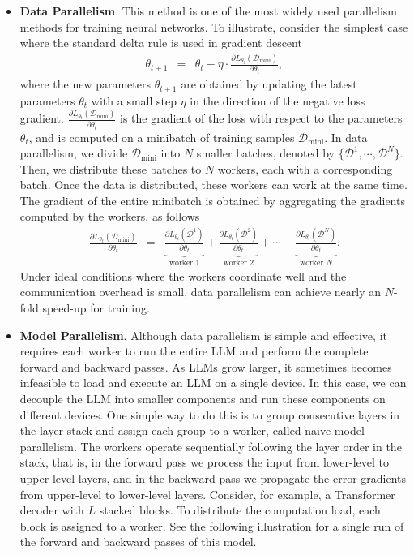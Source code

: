 \begin{itemize}
\item \vspace{0.5em} \textbf{Data Parallelism}. This method is one of the most widely used parallelism methods for training neural networks. To illustrate, consider the simplest case where the standard delta rule is used in gradient descent
    \begin{eqnarray}
    \theta_{t+1} & = & \theta_{t} - \eta \cdot \frac{\partial L_{\theta_t}(\mathcal{D}_{\mathrm{mini}})}{\partial \theta_t},
    \end{eqnarray}
    \noindent where the new parameters $\theta_{t+1}$ are obtained by updating the latest parameters $\theta_{t}$ with a small step $\eta$ in the direction of the negative loss gradient. $\frac{\partial L_{\theta_t}(\mathcal{D}_{\mathrm{mini}})}{\partial \theta_t}$ is the gradient of the loss with respect to the parameters $\theta_t$, and is computed on a minibatch of training samples $\mathcal{D}_{\mathrm{mini}}$. In data parallelism, we divide $\mathcal{D}_{\mathrm{mini}}$ into $N$ smaller batches, denoted by $\{\mathcal{D}^{1},\cdots,\mathcal{D}^{N}\}$. Then, we distribute these batches to $N$ workers, each with a corresponding batch. Once the data is distributed, these workers can work at the same time. The gradient of the entire minibatch is obtained by aggregating the gradients computed by the workers, as follows
    \begin{eqnarray}
    \frac{\partial L_{\theta_t}(\mathcal{D}_{\mathrm{mini}})}{\partial \theta_t} & = & \underbrace{\frac{\partial L_{\theta_t}(\mathcal{D}^{1})}{\partial \theta_t}}_{\textrm{worker 1}} + \underbrace{\frac{\partial L_{\theta_t}(\mathcal{D}^{2})}{\partial \theta_t}}_{\textrm{worker 2}} + \cdots + \underbrace{\frac{\partial L_{\theta_t}(\mathcal{D}^{N})}{\partial \theta_t}}_{\textrm{worker $N$}}.
    \end{eqnarray}
    Under ideal conditions where the workers coordinate well and the communication overhead is small, data parallelism can achieve nearly an $N$-fold speed-up for training.
\item \vspace{0.3em} \textbf{Model Parallelism}. Although data parallelism is simple and effective, it requires each worker to run the entire LLM and perform the complete forward and backward passes. As LLMs grow larger, it sometimes becomes infeasible to load and execute an LLM on a single device. In this case, we can decouple the LLM into smaller components and run these components on different devices. One simple way to do this is to group consecutive layers in the layer stack and assign each group to a worker, called naive model parallelism. The workers operate sequentially following the layer order in the stack, that is, in the forward pass we process the input from lower-level to upper-level layers, and in the backward pass we propagate the error gradients from upper-level to lower-level layers. Consider, for example, a Transformer decoder with $L$ stacked blocks. To distribute the computation load, each block is assigned to a worker. See the following illustration for a single run of the forward and backward passes of this model.


\end{itemize}
